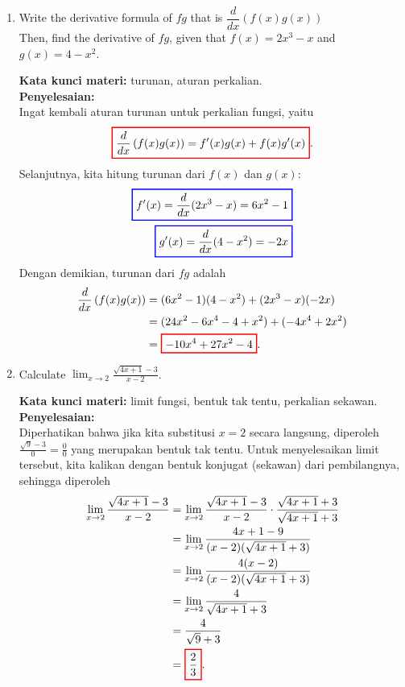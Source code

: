 \documentclass[10pt,openany,a4paper]{article}
\theoremstyle{definition}
\theoremstyle{definition}
\theoremstyle{plain}
\newenvironment{jawab}[2][tes]{%
\par\noindent\textbf{Kata kunci materi:} #1.\\
\textbf{Penyelesaian:} #2%
}{}
\begin{document}
\begin{enumerate}
    \item Write the derivative formula of $fg$ that is $\dfrac{d}{dx}(f(x)g(x))$\\
    Then, find the derivative of $fg$, given that $f(x)=2x^3-x$ and $g(x)=4-x^2$.
    \begin{jawab}[turunan, aturan perkalian]{~\\
        Ingat kembali aturan turunan untuk perkalian fungsi, yaitu
        \[
        \colorlet{oldcolor}{.}
        \color{red}
        \setlength{\fboxrule}{1pt} \boxed{\color{oldcolor}\frac{d}{dx}\left(f(x)g(x)\right) = f'(x)g(x) + f(x)g'(x)}\color{oldcolor}.
        \]
        Selanjutnya, kita hitung turunan dari \(f(x)\) dan \(g(x)\):
        \begin{align*}
            \colorlet{oldcolor}{.}
        \color{blue}
        \setlength{\fboxrule}{1pt} \boxed{\color{oldcolor}f'(x) = \frac{d}{dx}(2x^3 - x) = 6x^2 - 1}\color{oldcolor}\\
            \colorlet{oldcolor}{.}
        \color{blue}
        \setlength{\fboxrule}{1pt} \boxed{\color{oldcolor}g'(x) = \frac{d}{dx}(4 - x^2) = -2x}\color{oldcolor}
        \end{align*}
        Dengan demikian, turunan dari \(fg\) adalah
        \begin{align*}
            \frac{d}{dx}\left(f(x)g(x)\right) &= (6x^2 - 1)(4 - x^2) + (2x^3 - x)(-2x)\\
            &= (24x^2 - 6x^4 - 4 + x^2) + (-4x^4 + 2x^2)\\
            &= \colorlet{oldcolor}{.}
        \color{red}
        \setlength{\fboxrule}{1pt} \boxed{\color{oldcolor}-10x^4 + 27x^2 - 4}\color{oldcolor}.
        \end{align*}
    }
    \end{jawab}

    \item Calculate $\displaystyle\lim_{x\to 2}\frac{\sqrt{4x+1}-3}{x-2}$.
    \begin{jawab}[limit fungsi, bentuk tak tentu, perkalian sekawan]{~\\
        Diperhatikan bahwa jika kita substitusi $x=2$ secara langsung, diperoleh $\frac{\sqrt{9}-3}{0}=\frac{0}{0}$ yang merupakan bentuk tak tentu. Untuk menyelesaikan limit tersebut, kita kalikan dengan bentuk konjugat (sekawan) dari pembilangnya, sehingga diperoleh
        \begin{align*}
            \lim_{x\to 2} \frac{\sqrt{4x+1}-3}{x-2} &= \lim_{x\to 2} \frac{\sqrt{4x+1}-3}{x-2}\cdot\frac{\sqrt{4x+1}+3}{\sqrt{4x+1}+3}\\
            &= \lim_{x\to 2} \frac{4x+1-9}{(x-2)(\sqrt{4x+1}+3)}\\
            &= \lim_{x\to 2} \frac{4(x-2)}{(x-2)(\sqrt{4x+1}+3)}\\
            &= \lim_{x\to 2} \frac{4}{\sqrt{4x+1}+3}\\
            &= \frac{4}{\sqrt{9}+3}\\
            &= \colorlet{oldcolor}{.}
        \color{red}
        \setlength{\fboxrule}{1pt} \boxed{\color{oldcolor}\frac{2}{3}}\color{oldcolor}.
        \end{align*}
    }
    \end{jawab}


\end{enumerate}
\end{document}
